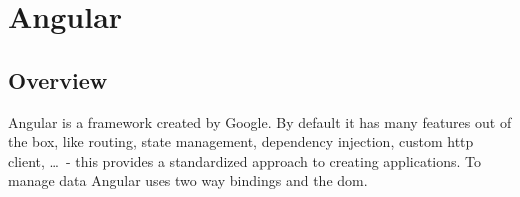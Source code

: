 
\section{Angular}
\label{sec:angular}

\subsection{Overview}
\label{subsec:angular:overview}

Angular is a \gls{framework} created by Google. By default it has many features out of the box, like routing, state management, dependency injection, custom \acrshort{http} client, \dots\ - this provides a standardized approach to creating applications. To manage data Angular uses two way bindings and the \acrshort{dom}.


